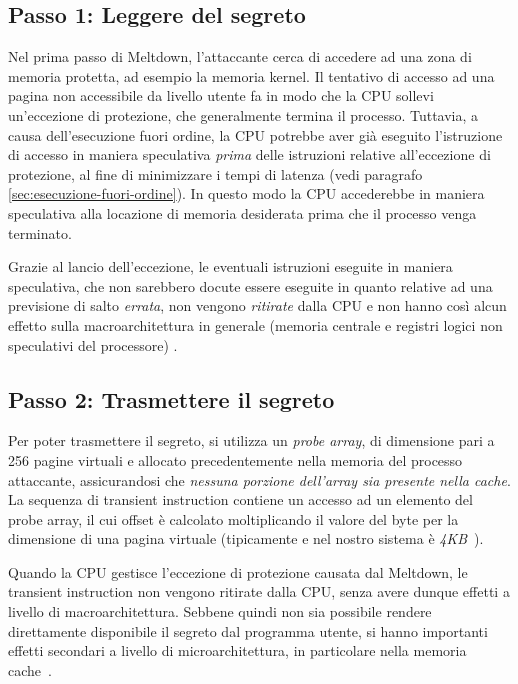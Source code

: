 \subsection{Passo 1: Leggere del segreto}
Nel prima passo di Meltdown, l'attaccante cerca di accedere ad una zona di memoria protetta, ad esempio la memoria kernel.
Il tentativo di accesso ad una pagina non accessibile da livello utente fa in modo che la CPU sollevi un'eccezione di protezione, che generalmente termina il processo. 
Tuttavia, a causa dell'esecuzione fuori ordine, la CPU potrebbe aver già eseguito l'istruzione di accesso in maniera speculativa \emph{prima} delle istruzioni relative all'eccezione di protezione, al fine di minimizzare i tempi di latenza (vedi paragrafo \ref{sec:esecuzione-fuori-ordine}).
In questo modo la CPU accederebbe in maniera speculativa alla locazione di memoria desiderata prima che il processo venga terminato.

Grazie al lancio dell'eccezione, le eventuali istruzioni eseguite in maniera speculativa, che non sarebbero docute essere eseguite in quanto relative ad una previsione di salto \emph{errata}, non vengono \emph{ritirate} dalla CPU e non hanno così alcun effetto sulla macroarchitettura in generale (memoria centrale e registri logici non speculativi del processore) \cite{frosini:calcolatori2}.

\subsection{Passo 2: Trasmettere il segreto}
Per poter trasmettere il segreto, si utilizza un \emph{probe array}, di dimensione pari a 256 pagine virtuali e allocato precedentemente nella memoria del processo attaccante, assicurandosi che \emph{nessuna porzione dell'array sia presente nella cache}. 
La sequenza di transient instruction contiene un accesso ad un elemento del probe array, il cui offset è calcolato moltiplicando il valore del byte per la dimensione di una pagina virtuale (tipicamente e nel nostro sistema  è \emph{4KB}~\cite{lettieri:paginazione}).

Quando la CPU gestisce l'eccezione di protezione causata dal Meltdown, le transient instruction non vengono ritirate dalla CPU, senza avere dunque effetti a livello di macroarchitettura. Sebbene quindi non sia possibile rendere direttamente disponibile il segreto dal programma utente, si hanno importanti effetti secondari a livello di microarchitettura, in particolare nella memoria cache~\cite{lipp:meltdown}.

